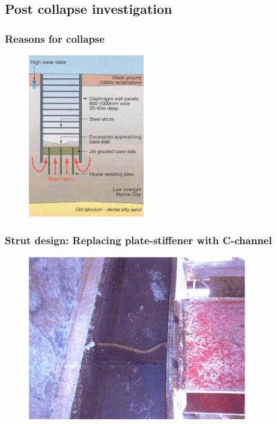 \documentclass[notes]{beamer}
\begin{document}
\subsection{Post collapse investigation}
\begin{frame}
\frametitle{Reasons for collapse}
\begin{figure}[ht]
	\centering
	\includegraphics[width=0.45\textwidth]{figs/reasons-collapse.png}
\end{figure}
\end{frame}


\begin{frame}
\frametitle{Strut design: Replacing plate-stiffener with C-channel}
\begin{figure}[ht]
	\centering
	\includegraphics[width=0.85\textwidth]{figs/plate-stiffener.png}
\end{figure}
\end{frame}
\end{document}
